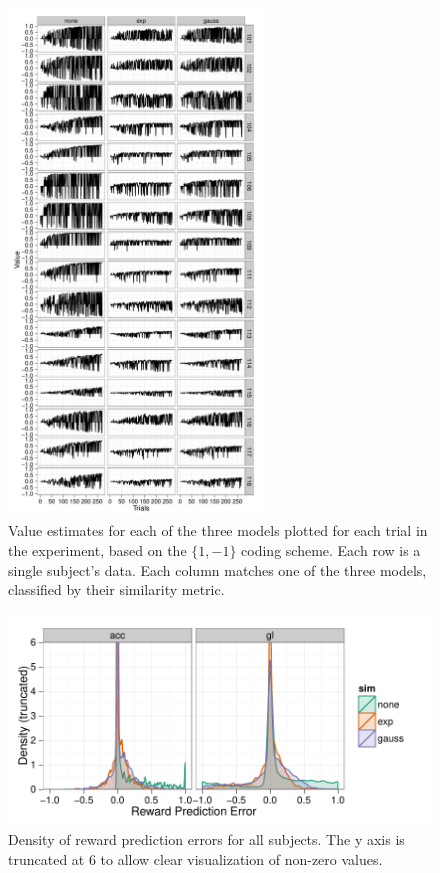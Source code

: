 \begin{figure}[tp]
    \includegraphics[width=0.6\textwidth]{f_value_gl}
    \centering
    \caption{Value estimates for each of the three models plotted for each trial in the experiment, based on the $\{1,-1\}$ coding scheme.   Each row is a single subject's data.  Each column matches one of the three models, classified by their similarity metric.}
    \label{fig:valuegl}
\end{figure}
\begin{figure}[tp]
    \includegraphics{f_density_rpe}
    \centering
    \caption{Density of reward prediction errors for all subjects.  The y axis is truncated at 6 to allow clear visualization of non-zero values.}
    \label{fig:denrpe}
\end{figure}

